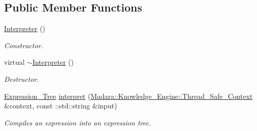 \subsection*{Public Member Functions}
\begin{DoxyCompactItemize}
\item 
\hyperlink{classMadara_1_1Expression__Tree_1_1Interpreter_a4721a518d1ff3344bb85adc8f2069ced}{Interpreter} ()
\begin{DoxyCompactList}\small\item\em Constructor. \item\end{DoxyCompactList}\item 
virtual \hyperlink{classMadara_1_1Expression__Tree_1_1Interpreter_a5874ada868c66dc7d760660347058121}{$\sim$Interpreter} ()
\begin{DoxyCompactList}\small\item\em Destructor. \item\end{DoxyCompactList}\item 
\hyperlink{classMadara_1_1Expression__Tree_1_1Expression__Tree}{Expression\_\-Tree} \hyperlink{classMadara_1_1Expression__Tree_1_1Interpreter_a0d6173bb72445131b1564ceda351fefc}{interpret} (\hyperlink{classMadara_1_1Knowledge__Engine_1_1Thread__Safe__Context}{Madara::Knowledge\_\-Engine::Thread\_\-Safe\_\-Context} \&context, const ::std::string \&input)
\begin{DoxyCompactList}\small\item\em Compiles an expression into an expression tree. \item\end{DoxyCompactList}\end{DoxyCompactItemize}
